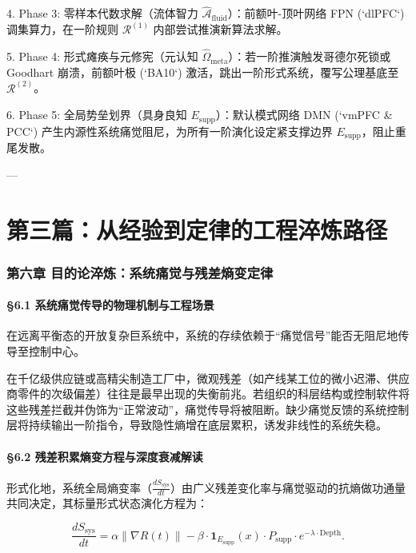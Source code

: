 \documentclass[11pt,a4paper,oneside]{ctexart}
\begin{document}
4. \textit{}Phase 3: 零样本代数求解（流体智力 $\hat{\mathcal{A}}_{\text{fluid}}$）\textit{}：前额叶-顶叶网络 FPN (`dlPFC`) 调集算力，在一阶规则 $\mathcal{R}^{(1)}$ 内部尝试推演新算法求解。

5. \textit{}Phase 4: 形式瘫痪与元修宪（元认知 $\hat{\Omega}_{\text{meta}}$）\textit{}：若一阶推演触发哥德尔死锁或 Goodhart 崩溃，前额叶极 (`BA10`) 激活，跳出一阶形式系统，覆写公理基底至 $\mathcal{R}^{(2)}$。

6. \textit{}Phase 5: 全局势垒划界（具身良知 $E_{\text{supp}}$）\textit{}：默认模式网络 DMN (`vmPFC \& PCC`) 产生内源性系统痛觉阻尼，为所有一阶演化设定紧支撑边界 $E_{\text{supp}}$，阻止重尾发散。


---


\part{第三篇：从经验到定律的工程淬炼路径}

\section{第六章 目的论淬炼：系统痛觉与残差熵变定律}

\subsection{§6.1 系统痛觉传导的物理机制与工程场景}

在远离平衡态的开放复杂巨系统中，系统的存续依赖于“痛觉信号”能否无阻尼地传导至控制中心。


在千亿级供应链或高精尖制造工厂中，微观残差（如产线某工位的微小迟滞、供应商零件的次级偏差）往往是最早出现的失衡前兆。若组织的科层结构或控制软件将这些残差拦截并伪饰为“正常波动”，痛觉传导将被阻断。缺少痛觉反馈的系统控制层将持续输出一阶指令，导致隐性熵增在底层累积，诱发非线性的系统失稳。


\subsection{§6.2 残差积累熵变方程与深度衰减解读}

形式化地，系统全局熵变率（$\frac{d S_{\text{sys}}}{dt}$）由广义残差变化率与痛觉驱动的抗熵做功通量共同决定，其标量形式状态演化方程为：


\begin{equation}
\frac{d S_{\text{sys}}}{dt} = \alpha \|\nabla R(t)\| - \beta \cdot \mathbf{1}_{E_{\text{supp}}}(x) \cdot P_{\text{supp}} \cdot e^{-\lambda \cdot \text{Depth}}.
\end{equation}
\end{document}
